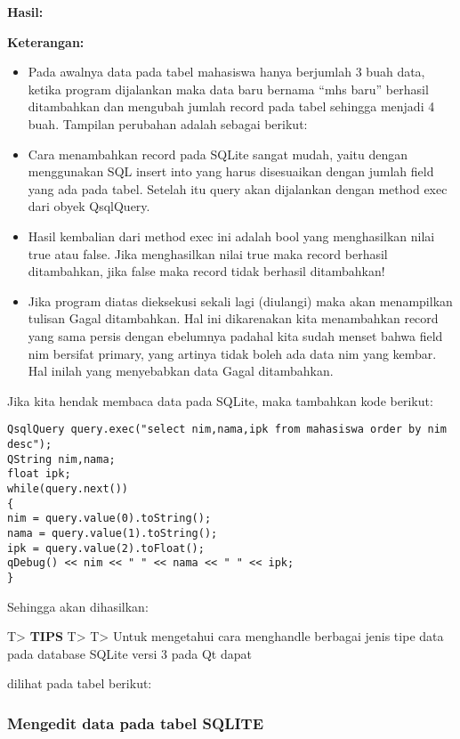 \textbf{Hasil:}

\textbf{Keterangan:}

\begin{itemize}
\item
  Pada awalnya data pada tabel mahasiswa hanya berjumlah 3 buah data,
  ketika program dijalankan maka data baru bernama ``mhs baru'' berhasil
  ditambahkan dan mengubah jumlah record pada tabel sehingga menjadi 4
  buah. Tampilan perubahan adalah sebagai berikut:
\item
  Cara menambahkan record pada SQLite sangat mudah, yaitu dengan
  menggunakan SQL insert into yang harus disesuaikan dengan jumlah field
  yang ada pada tabel. Setelah itu query akan dijalankan dengan method
  exec dari obyek QsqlQuery.
\item
  Hasil kembalian dari method exec ini adalah bool yang menghasilkan
  nilai true atau false. Jika menghasilkan nilai true maka record
  berhasil ditambahkan, jika false maka record tidak berhasil
  ditambahkan!
\item
  Jika program diatas dieksekusi sekali lagi (diulangi) maka akan
  menampilkan tulisan Gagal ditambahkan. Hal ini dikarenakan kita
  menambahkan record yang sama persis dengan ebelumnya padahal kita
  sudah menset bahwa field nim bersifat primary, yang artinya tidak
  boleh ada data nim yang kembar. Hal inilah yang menyebabkan data Gagal
  ditambahkan.
\end{itemize}

Jika kita hendak membaca data pada SQLite, maka tambahkan kode berikut:

\begin{verbatim}
QsqlQuery query.exec("select nim,nama,ipk from mahasiswa order by nim desc");
QString nim,nama;
float ipk;
while(query.next())
{
nim = query.value(0).toString();
nama = query.value(1).toString();
ipk = query.value(2).toFloat();
qDebug() << nim << " " << nama << " " << ipk;
}
\end{verbatim}

Sehingga akan dihasilkan:

T\textgreater{} \textbf{TIPS} T\textgreater{} T\textgreater{} Untuk
mengetahui cara menghandle berbagai jenis tipe data pada database SQLite
versi 3 pada Qt dapat

dilihat pada tabel berikut:

\subsubsection{Mengedit data pada tabel
SQLITE}\label{mengedit-data-pada-tabel-sqlite}

